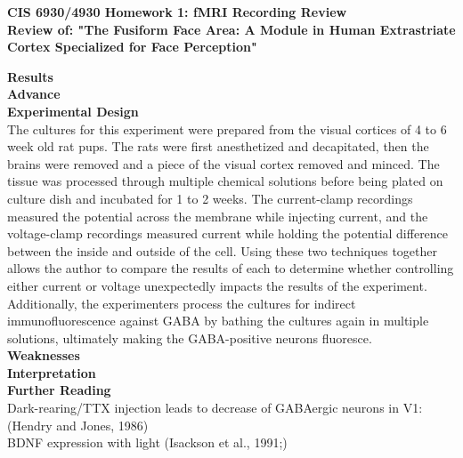 \documentclass[11pt]{article}
\begin{document}
\begin{center}
{\large {\bf CIS 6930/4930 Homework 1: fMRI Recording Review}}\\
{\normalsize {\bf Review of: "The Fusiform Face Area: A Module in Human Extrastriate Cortex
Specialized for Face Perception"}}
\end{center}

\textbf{Results} \\

\textbf{Advance} \\

\textbf{Experimental Design} \\
The cultures for this experiment were prepared from the visual cortices of 4 to 6
week old rat pups.  The rats were first anesthetized and decapitated, then the brains
were removed and a piece of the visual cortex removed and minced.  The tissue was
processed through multiple chemical solutions before being plated on culture dish
and incubated for 1 to 2 weeks.  The current-clamp recordings measured the potential 
across the membrane while injecting current, and the voltage-clamp recordings measured
current while holding the potential difference between the inside and outside of
the cell.  Using these two techniques together allows the author to compare the
results of each to determine whether controlling either current or voltage unexpectedly
impacts the results of the experiment.  Additionally, the experimenters process
the cultures for indirect immunofluorescence against GABA by bathing the cultures
again in multiple solutions, ultimately making the GABA-positive neurons fluoresce. \\

\textbf{Weaknesses} \\

\textbf{Interpretation} \\

\textbf{Further Reading} \\
Dark-rearing/TTX injection leads to decrease of GABAergic neurons in V1: (Hendry
and Jones, 1986) \\
BDNF expression with light (Isackson et al., 1991;) \\
\end{document}
